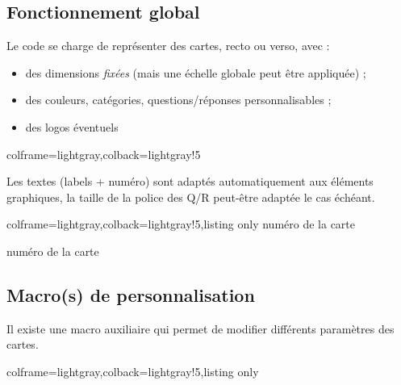 \documentclass[11pt,a4paper]{ltxdoc}
\begin{document}
\subsection{Fonctionnement global}

Le code se charge de représenter des cartes, recto ou verso, avec :

\begin{itemize}
	\item des dimensions \textit{fixées} (mais une échelle globale peut être appliquée) ;
	\item des couleurs, catégories, questions/réponses personnalisables ;
	\item des logos éventuels
\end{itemize}

\begin{tcblisting}{colframe=lightgray,colback=lightgray!5}


\end{tcblisting}

Les textes (labels + numéro) sont adaptés automatiquement aux éléments graphiques, la taille de la police des Q/R peut-être adaptée le cas échéant.

\begin{tcblisting}{colframe=lightgray,colback=lightgray!5,listing only}
%
  {numéro de la carte}

%
  {numéro de la carte}
\end{tcblisting}

\subsection{Macro(s) de personnalisation}

Il existe une macro auxiliaire qui permet de modifier différents paramètres des cartes.

\begin{tcblisting}{colframe=lightgray,colback=lightgray!5,listing only}
\end{tcblisting}
\end{document}
